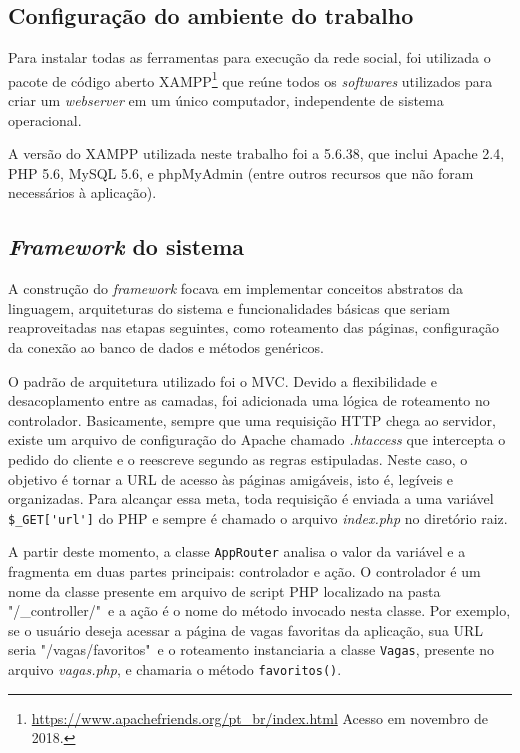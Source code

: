 \subsection{Configuração do ambiente do trabalho}
\label{implementacaoConfig}

Para instalar todas as ferramentas para execução da rede social, foi utilizada o pacote de código aberto XAMPP\footnote{\url{https://www.apachefriends.org/pt_br/index.html} Acesso em novembro de 2018.} que reúne todos os \textit{softwares} utilizados para criar um \textit{webserver} em um único computador, independente de sistema operacional.

A versão do XAMPP utilizada neste trabalho foi a 5.6.38, que inclui  Apache 2.4, PHP 5.6, MySQL 5.6,  e phpMyAdmin (entre outros recursos que não foram necessários à aplicação).

\subsection{\textit{Framework} do sistema}
\label{implementacaoFramework}

A construção do \textit{framework} focava em implementar conceitos abstratos da linguagem, arquiteturas do sistema e funcionalidades básicas que seriam reaproveitadas nas etapas seguintes, como roteamento das páginas, configuração da conexão ao banco de dados e métodos genéricos.

O padrão de arquitetura utilizado foi o MVC. Devido a flexibilidade e desacoplamento entre as camadas, foi adicionada uma lógica de roteamento no controlador. Basicamente, sempre que uma requisição HTTP chega ao servidor, existe um arquivo de configuração do Apache chamado \textit{.htaccess} que intercepta o pedido do cliente e o reescreve segundo as regras estipuladas. Neste caso, o objetivo é tornar a URL de acesso às páginas amigáveis, isto é, legíveis e organizadas. Para alcançar essa meta, toda requisição é enviada a uma variável \verb|$_GET['url']| do PHP e sempre é chamado o arquivo \textit{index.php} no diretório raiz.

A partir deste momento, a classe \verb|AppRouter| analisa o valor da variável e a fragmenta em duas partes principais: controlador e ação. O controlador é um nome da classe presente em arquivo de script PHP localizado na pasta "/\_controller/"\ e a ação é o nome do método invocado nesta classe. Por exemplo, se o usuário deseja acessar a página de vagas favoritas da aplicação, sua URL seria "/vagas/favoritos"\ e o roteamento instanciaria a classe \verb|Vagas|, presente no arquivo \textit{vagas.php}, e chamaria o método \verb|favoritos()|. 

